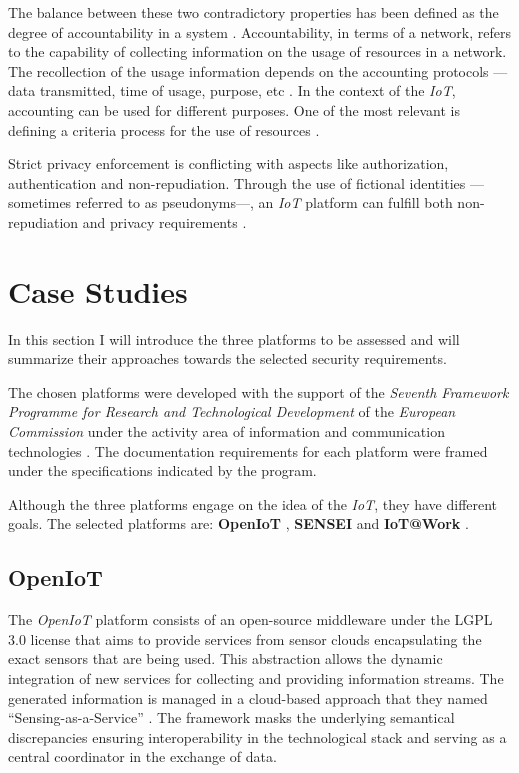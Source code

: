 \documentclass[journal]{IEEEtran}
\begin{document}
  The balance between these two contradictory properties has been defined as the degree of accountability in a system \cite{Bassi2013}. Accountability, in terms of a network, refers to the capability of collecting information on the usage of resources in a network. The recollection of the usage information depends on the accounting protocols ---data transmitted, time of usage, purpose, etc  \cite{Sklavos2007}. In the context of the \emph{IoT}, accounting can be used for different purposes. One of the most relevant is defining a criteria process for the use of resources \cite{Bauge2010}.

  Strict privacy enforcement is conflicting with aspects like authorization, authentication and non-repudiation. Through the use of fictional identities ---sometimes referred to as pseudonyms---, an \emph{IoT} platform can fulfill both non-repudiation and privacy requirements \cite{Baldini2012}. 
  
\section{Case Studies}
  In this section I will introduce the three platforms to be assessed and will summarize their approaches towards the selected security requirements.

  The chosen platforms were developed with the support of the \emph{Seventh Framework Programme for Research and Technological Development} of the \emph{European Commission} under the activity area of information and communication technologies \cite{FP7}\cite{FP7-ICT}\cite{ICT}. The documentation requirements for each platform were framed under the specifications indicated by the program.

  Although the three platforms engage on the idea of the \emph{IoT}, they have different goals. The selected platforms are: \textbf{OpenIoT} \cite{OpenIoT}, \textbf{SENSEI} \cite{SENSEI} and \textbf{IoT@Work} \cite{IoTWork}.

  \subsection{OpenIoT}
  The \emph{OpenIoT} platform \cite{OpenIoTWeb} consists of an open-source middleware under the LGPL 3.0 license that aims to provide services from sensor clouds encapsulating the exact sensors that are being used. This abstraction allows the dynamic integration of new services for collecting and providing information streams. The generated information is managed in a cloud-based approach that they named ``Sensing-as-a-Service'' \cite{Baldini2012}.  The framework masks the underlying semantical discrepancies ensuring interoperability in the technological stack and serving as a central coordinator in the exchange of data.
\end{document}
